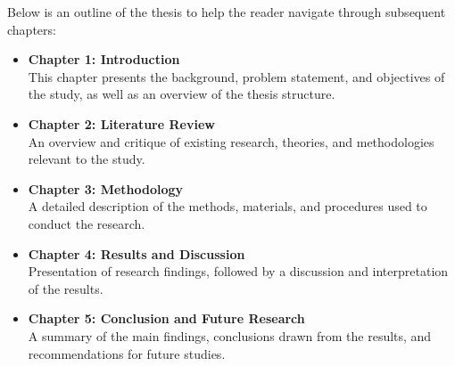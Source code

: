 Below is an outline of the thesis to help the reader navigate through subsequent chapters:

\begin{itemize}
    \item \textbf{Chapter 1: Introduction} \\
    This chapter presents the background, problem statement, and objectives of the study, as well as an overview of the thesis structure.

    \item \textbf{Chapter 2: Literature Review} \\
    An overview and critique of existing research, theories, and methodologies relevant to the study.

    \item \textbf{Chapter 3: Methodology} \\
    A detailed description of the methods, materials, and procedures used to conduct the research.

    \item \textbf{Chapter 4: Results and Discussion} \\
    Presentation of research findings, followed by a discussion and interpretation of the results.

    \item \textbf{Chapter 5: Conclusion and Future Research} \\
    A summary of the main findings, conclusions drawn from the results, and recommendations for future studies.
\end{itemize}
